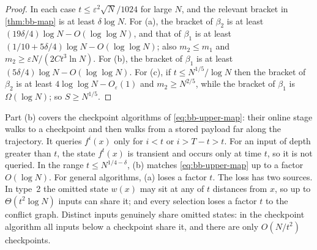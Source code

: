 \documentclass[11pt]{article}
\newtheorem{corollary}[theorem]{Corollary}
\theoremstyle{definition}
\theoremstyle{remark}
\numberwithin{equation}{section}
\begin{document}

\begin{proof}
In each case $t\leq\varepsilon^2\sqrt N/1024$ for large $N$, and the
relevant bracket in \cref{thm:bb-map} is at least $\delta\log N$.  For
(a), the bracket of $\beta_2$ is at least
$(19\delta/4)\log N-O(\log\log N)$, and that of $\beta_1$ is at least
$(1/10+5\delta/4)\log N-O(\log\log N)$; also $m_2\leq m_1$ and
$m_2\geq\varepsilon N/(2Ct^3\ln N)$.  For (b), the bracket of $\beta_1$ is
at least $(5\delta/4)\log N-O(\log\log N)$.  For (c), if
$t\leq N^{1/5}/\log N$ then the bracket of $\beta_2$ is at least
$4\log\log N-O_\varepsilon(1)$ and $m_2\geq N^{2/5}$, while the bracket
of $\beta_1$ is $\Omega(\log N)$; so $S\geq N^{1/5}$.
\end{proof}

Part (b) covers the checkpoint algorithms of \cref{eq:bb-upper-map}: their
online stage walks to a checkpoint and then walks from a stored payload
far along the trajectory.  It queries $f^i(x)$ only for $i<t$ or
$i>T-t>t$.  For an input of depth greater than $t$, the state $f^t(x)$ is
transient and occurs only at time $t$, so it is not queried.  In the range
$t\leq N^{1/4-\delta}$, (b) matches
\cref{eq:bb-upper-map} up to a factor $O(\log N)$.  For general
algorithms, (a) loses a factor $t$.  The loss has two sources.  In
type~2 the omitted state $w(x)$ may sit at any of $t$ distances from $x$,
so up to $\Theta(t^2\log N)$ inputs can share it; and every selection loses
a factor $t$ to the conflict graph.  Distinct inputs genuinely share
omitted states: in the checkpoint algorithm all inputs below a checkpoint
share it, and there are only $O(N/t^2)$ checkpoints.
\end{document}
